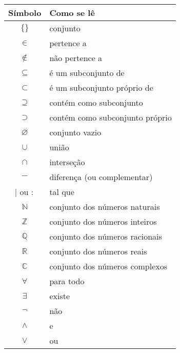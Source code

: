 \documentclass[a4paper,12pt]{article}  %
\begin{document}
\begin{table}[h]
    \centering
    \begin{tabularx}{\textwidth}{|c|X|}
        \hline
        \textbf{Símbolo}      & \textbf{Como se lê}             \\
        \hline
        \( \{ \} \)           & conjunto                        \\
        \( \in \)             & pertence a                      \\
        \( \notin \)          & não pertence a                  \\
        \( \subseteq \)       & é um subconjunto de             \\
        \( \subset \)         & é um subconjunto próprio de     \\
        \( \supseteq \)       & contém como subconjunto         \\
        \( \supset \)         & contém como subconjunto próprio \\
        \( \varnothing \)     & conjunto vazio                  \\
        \( \cup \)            & união                           \\
        \( \cap \)            & interseção                      \\
        \( - \)               & diferença (ou complementar)     \\
        \( \mid \) ou \( : \) & tal que                         \\
        \( \mathbb{N} \)      & conjunto dos números naturais   \\
        \( \mathbb{Z} \)      & conjunto dos números inteiros   \\
        \( \mathbb{Q} \)      & conjunto dos números racionais  \\
        \( \mathbb{R} \)      & conjunto dos números reais      \\
        \( \mathbb{C} \)      & conjunto dos números complexos  \\
        \( \forall \)         & para todo                       \\
        \( \exists \)         & existe                          \\
        \( \neg \)            & não                             \\
        \( \land \)           & e                               \\
        \( \lor \)            & ou                              \\

\end{tabularx}
\end{table}
\end{document}
